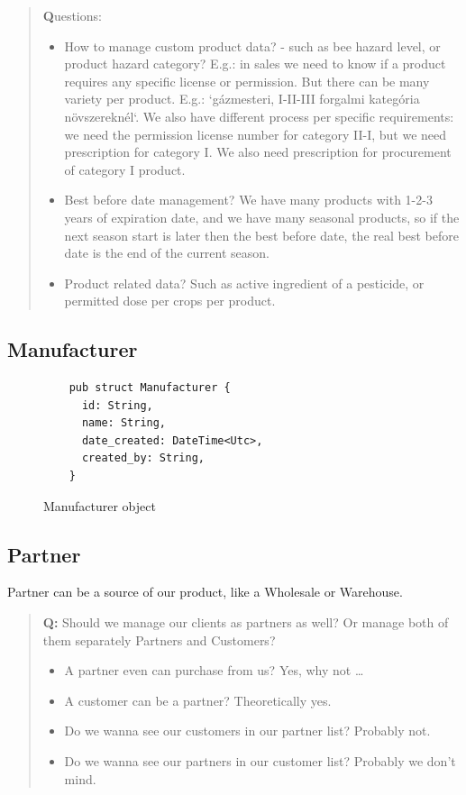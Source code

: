 \documentclass{article}
\begin{document}
\begin{quote}
  {\large \textbf{Q}uestions:}
  \begin{itemize}
    \item How to manage custom product data? - such as bee hazard level,
          or product hazard category? E.g.: in sales we need to know if a
          product requires any specific license or permission. But there can
          be many variety per product. E.g.: `gázmesteri, I-II-III forgalmi
          kategória növszereknél`. We also have different process per specific
          requirements: we need the permission license number for category
          II-I, but we need prescription for category I. We also need
          prescription for procurement of category I product.
    \item Best before date management? We have many products with 1-2-3
          years of expiration date, and we have many seasonal products, so
          if the next season start is later then the best before date, the real
          best before date is the end of the current season.
    \item Product related data? Such as active ingredient of a pesticide,
          or permitted dose per crops per product.
  \end{itemize}
\end{quote}

\subsection{Manufacturer}

\begin{figure}[!htb]
  \caption{Manufacturer object}
  \begin{verbatim}
    pub struct Manufacturer {
      id: String,
      name: String,
      date_created: DateTime<Utc>,
      created_by: String,
    }
  \end{verbatim}
\end{figure}

\newpage
\subsection{Partner}

Partner can be a source of our product, like a Wholesale or Warehouse.

\begin{quote}
  {\large \textbf{Q:}} Should
  we manage our clients as partners as well?
  Or manage both of them separately Partners and Customers?
  \begin{itemize}
    \item A partner even can purchase from us? Yes, why not \dots
    \item A customer can be a partner? Theoretically yes.
    \item Do we wanna see our customers in our partner list? Probably not.
    \item Do we wanna see our partners in our customer list? Probably we don't mind.
  \end{itemize}
\end{quote}
\end{document}
